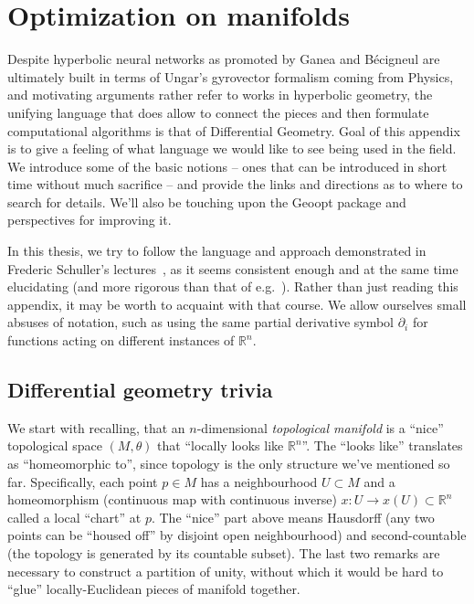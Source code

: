 \chapter{Optimization on manifolds} \label{chap:manifolds}


Despite hyperbolic neural networks as promoted by Ganea and B\'ecigneul are
ultimately built in terms of Ungar's gyrovector formalism coming from Physics,
and motivating arguments rather refer  to works in hyperbolic geometry, the
unifying language that does allow to connect the pieces and then formulate
computational algorithms is that of Differential Geometry. Goal of this appendix
is to give a feeling of what language we would like to see being used in the field.
We introduce some of the basic notions -- ones that can be introduced in short time
without much sacrifice -- and provide the links and directions as to where to search
for details.
We'll also be touching upon the Geoopt package and perspectives for improving
it.

In this thesis, we try to follow the language and approach demonstrated in
Frederic Schuller's lectures~\cite{geometricAnatomy,gravityLight}, as it seems
consistent enough and at the same time elucidating (and more rigorous than that
of e.g.~\citep{leeSmooth,leeRiem}). Rather than just reading this appendix, it
may be worth to acquaint with that course. We allow ourselves small absuses of
notation, such as using the same partial derivative symbol \( \partial_i \) for
functions acting on different instances of \( \mathbb{R}^n \).

\section{Differential geometry trivia}

We start with recalling, that an \( n \)-dimensional \emph{topological
manifold} is a ``nice'' topological space \( (M, \theta) \) that ``locally
looks like \(\mathbb{R}^n\)''.  The ``looks like'' translates as ``homeomorphic
to'', since topology is the only structure we've mentioned so far.
Specifically, each point \( p\in M \) has a neighbourhood \( U\subset M \) and
a homeomorphism (continuous map with continuous inverse) \( x:U \to
x(U)\subset\mathbb{R}^n \) called a local ``chart'' at \( p \).
The ``nice'' part above means Hausdorff (any two points can be ``housed off''
by disjoint open neighbourhood) and second-countable (the topology is generated
by its countable subset). The last two remarks are necessary to construct a
partition of unity, without which it would be hard to ``glue''
locally-Euclidean pieces of manifold together.

